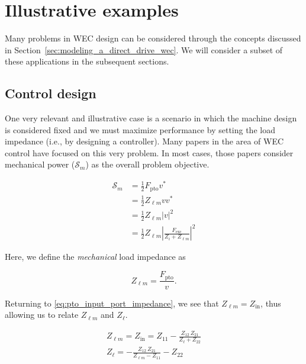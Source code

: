 \documentclass[lettersize,journal]{IEEEtran}
\begin{document}
\section{Illustrative examples}\label{sec:illustrative_examples}
Many problems in WEC design can be considered through the concepts discussed in Section~\ref{sec:modeling_a_direct_drive_wec}.
We will consider a subset of these applications in the subsequent sections.

\subsection{Control design}\label{sec:control_design}
One very relevant and illustrative case is a scenario in which the machine design is considered fixed and we must maximize performance by setting the load impedance (i.e., by designing a controller).
Many papers in the area of WEC control have focused on this very problem.
In most cases, those papers consider mechanical power ($\mathcal{S}_{m}$) as the overall problem objective.

\begin{equation}
\begin{aligned}
        \mathcal{S}_{m} 
        &= \frac{1}{2} F_{\textrm{pto}} v^* \\
        &= \frac{1}{2}Z_{\ell m} v v^* \\
        &= \frac{1}{2}Z_{\ell m} | v |^2 \\
        &= \frac{1}{2} Z_{\ell m} \left| \frac{F_{\textrm{exc}}}{Z_i + Z_{\ell m}} \right|^2
\end{aligned}
\end{equation}

\noindent{}Here, we define the \emph{mechanical} load impedance as

\begin{equation}
        Z_{\ell m} = \frac{F_{\textrm{pto}}}{v} .
\end{equation}

\noindent{}Returning to \eqref{eq:pto_input_port_impedance}, we see that $Z_{\ell m}=Z_{\textrm{in}}$, thus allowing us to relate $Z_{\ell m}$ and $Z_{\ell}$.

\begin{subequations}
        \begin{gather}
                Z_{\ell m} = Z_{\textrm{in}} = Z_{11} - \frac{Z_{12} \, Z_{21}}{Z_\ell + Z_{22}} \\
                Z_\ell = - \frac{Z_{12} \,Z_{21} }{Z_{\ell m} - Z_{11}} - Z_{22}
        \end{gather}
        \label{eq:Zl_Zlm}
\end{subequations}
\end{document}
